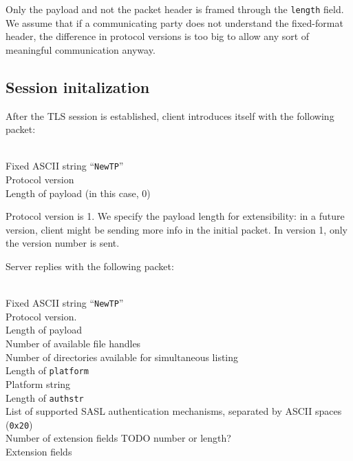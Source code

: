 Only the payload and not the packet header is framed through the {\tt length} field. We assume that if
a communicating party does not understand the fixed-format header, the difference in protocol versions is too
big to allow any sort of meaningful communication anyway.

%

\subsection{Session initalization}

\begin{samepage}
After the TLS session is established, client introduces itself with the following packet:
\begin{description}[parsep=1pt]
	 \hfill \\
		Fixed ASCII string ``{\tt NewTP}''
	 \hfill \\
		Protocol version
	 \hfill \\
		Length of payload (in this case, 0)
\end{description}

Protocol version is 1. We specify the payload length for extensibility: in a future version, client might be
sending more info in the initial packet. In version 1, only the version number is sent.
\end{samepage}

\begin{samepage}
Server replies with the following packet:
\begin{description}[parsep=1pt]
	 \hfill \\
		Fixed ASCII string ``{\tt NewTP}''
	 \hfill \\
		Protocol version.
	 \hfill \\
		Length of payload
	 \hfill \\
		Number of available file handles
	 \hfill \\
		Number of directories available for simultaneous listing
	 \hfill \\
		Length of {\tt platform}
	 \hfill \\
		Platform string
	 \hfill \\
		Length of {\tt authstr}
	 \hfill \\
		List of supported SASL authentication mechanisms, separated by ASCII spaces ({\tt 0x20})
	 \hfill \\
		Number of extension fields TODO number or length?
	 \hfill \\
		Extension fields
\end{description}
\end{samepage}


